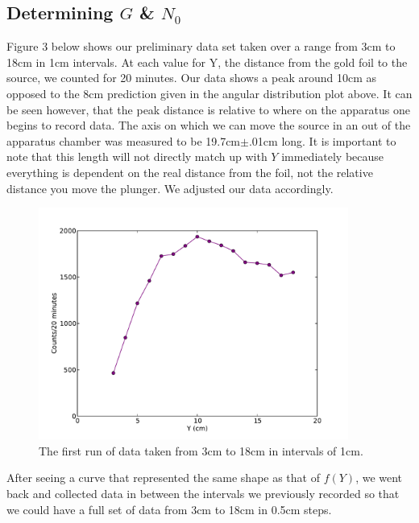 \subsection{Determining $G$ \& $N_0$}
Figure 3 below shows our preliminary data set taken over a range from 3cm to 18cm in 1cm intervals. At each value for Y, the distance from the gold foil to the source, we counted for 20 minutes. Our data shows a peak around 10cm as opposed to the 8cm prediction given in the angular distribution plot above. It can be seen however, that the peak distance is relative to where on the apparatus one begins to record data. The axis on which we can move the source in an out of the apparatus chamber was measured to be 19.7cm$\pm$.01cm long. It is important to note that this length will not directly match up with $Y$ immediately because everything is dependent on the real distance from the foil, not the relative distance you move the plunger. We adjusted our data accordingly.
\begin{figure}[H]
\begin{center}
\includegraphics[width=4in]{firstrun.pdf}
\caption{The first run of data taken from 3cm to 18cm in intervals of 1cm.}
\end{center}
\end{figure}
After seeing a curve that represented the same shape as that of $f(Y)$, we went back and collected data in between the intervals we previously recorded so that we could have a full set of data from 3cm to 18cm in 0.5cm steps. 
